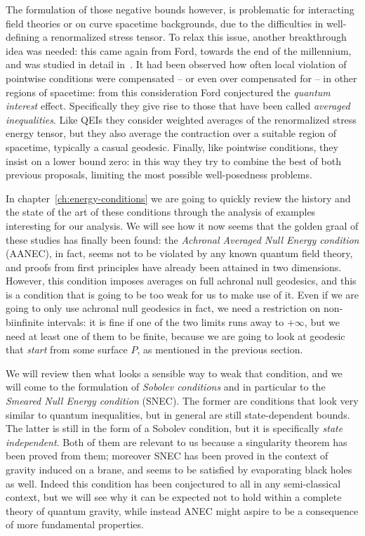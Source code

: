 The formulation of those negative bounds however, is problematic for interacting field theories or on curve spacetime backgrounds, due to the difficulties in well-defining a renormalized stress tensor. To relax this issue, another breakthrough idea was needed: this came again from Ford, towards the end of the millennium, and was studied in detail in~\cite[]{ford1999quantum}. It had been observed how often local violation of pointwise conditions were compensated -- or even over compensated for -- in other regions of spacetime: from this consideration Ford conjectured the \emph{quantum interest} effect. Specifically they give rise to those that have been called \emph{averaged inequalities}. Like QEIs they consider weighted averages of the renormalized stress energy tensor, but they also average the contraction over a suitable region of spacetime, typically a casual geodesic. Finally, like pointwise conditions, they insist on a lower bound zero: in this way they try to combine the best of both previous proposals, limiting the most possible well-posedness problems.

In chapter~\ref{ch:energy-conditions} we are going to quickly review the history and the state of the art of these conditions through the analysis of examples interesting for our analysis. We will see how it now seems that the golden graal of these studies has finally been found: the \emph{Achronal Averaged Null Energy condition} (AANEC), in fact, seems not to be violated by any known quantum field theory, and proofs from first principles have already been attained in two dimensions. However, this condition imposes averages on full achronal null geodesics, and this is a condition that is going to be too weak for us to make use of it.
Even if we are going to only use achronal null geodesics in fact, we need a restriction on non-biinfinite intervals: it is fine if one of the two limits runs away to \(+\infty\), but we need at least one of them to be finite, because we are going to look at geodesic that \emph{start} from some surface \(P\), as mentioned in the previous section.

We will review then what looks a sensible way to weak that condition, and we will come to the formulation of \emph{Sobolev conditions} and in particular to the \emph{Smeared Null Energy condition} (SNEC). The former are conditions that look very similar to quantum inequalities, but in general are still state-dependent bounds. The latter is still in the form of a Sobolev condition, but it is specifically \emph{state independent}. Both of them are relevant to us because a singularity theorem has been proved from them; moreover SNEC has been proved in the context of gravity induced on a brane, and seems to be satisfied by evaporating black holes as well. Indeed this condition has been conjectured to all in any semi-classical context, but we will see why it can be expected not to hold within a complete theory of quantum gravity, while instead ANEC might aspire to be a consequence of more fundamental properties.

